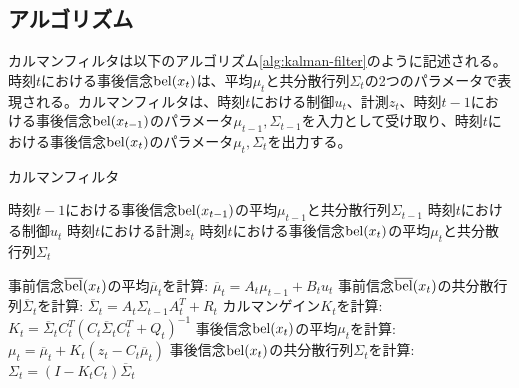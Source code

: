 \documentclass[dvipdfmx,a4paper]{jsarticle}
\begin{document}
\subsection{アルゴリズム}
カルマンフィルタは以下のアルゴリズム\ref{alg:kalman-filter}のように記述される。時刻$t$における事後信念$\operatorname{bel}(x_t)$は、平均$\mu_t$と共分散行列$\Sigma_t$の2つのパラメータで表現される。カルマンフィルタは、時刻$t$における制御$u_t$、計測$z_t$、時刻$t - 1$における事後信念$\operatorname{bel}(x_{t - 1})$のパラメータ$\mu_{t - 1}, \Sigma_{t - 1}$を入力として受け取り、時刻$t$における事後信念$\operatorname{bel}(x_t)$のパラメータ$\mu_t, \Sigma_t$を出力する。

\begin{algorithm}[H]
	\caption{カルマンフィルタ}
	\label{alg:kalman-filter}
	\begin{algorithmic}[1]
		\Require
			\Statex 時刻$t - 1$における事後信念$\operatorname{bel}(x_{t - 1})$の平均$\mu_{t - 1}$と共分散行列$\Sigma_{t - 1}$
			\Statex 時刻$t$における制御$u_t$
			\Statex 時刻$t$における計測$z_t$
		\Ensure
			\Statex 時刻$t$における事後信念$\operatorname{bel}(x_t)$の平均$\mu_t$と共分散行列$\Sigma_t$ \newline

		\State 事前信念$\operatorname{\overline{bel}}(x_t)$の平均$\overline{\mu}_t$を計算: $\overline{\mu}_t = A_t \mu_{t - 1} + B_t u_t$ \label{alg:kalman-filter-prediction-mu}
		\State 事前信念$\operatorname{\overline{bel}}(x_t)$の共分散行列$\overline{\Sigma}_t$を計算: $\overline{\Sigma}_t = A_t \Sigma_{t - 1} A_t^T + R_t$ \label{alg:kalman-filter-prediction-sigma}
		\State カルマンゲイン$K_t$を計算: $K_t = \overline{\Sigma}_t C_t^T \left( C_t \overline{\Sigma}_t C_t^T + Q_t \right)^{-1}$ \label{alg:kalman-filter-gain}
		\State 事後信念$\operatorname{bel}(x_t)$の平均$\mu_t$を計算: $\mu_t = \overline{\mu}_t + K_t \left( z_t - C_t \overline{\mu}_t \right)$ \label{alg:kalman-filter-correction-mu}
		\State 事後信念$\operatorname{bel}(x_t)$の共分散行列$\Sigma_t$を計算: $\Sigma_t = \left( I - K_t C_t \right) \overline{\Sigma}_t$ \label{alg:kalman-filter-correction-sigma}
	\end{algorithmic}
\end{algorithm}
\end{document}
